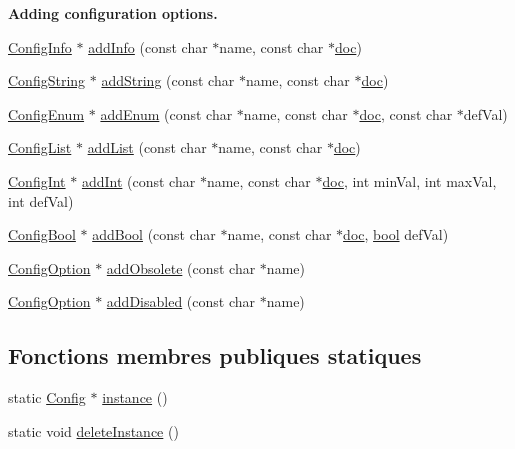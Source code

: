 \begin{Indent}{\bf Adding configuration options.}\par
\begin{DoxyCompactItemize}
\item 
\hyperlink{class_config_info}{Config\+Info} $\ast$ \hyperlink{class_config_ae00b233eba398ae52a97715150100cce}{add\+Info} (const char $\ast$name, const char $\ast$\hyperlink{vhdljjparser_8cpp_a9910424bf5401d657c3b3fdff6fcc152}{doc})
\item 
\hyperlink{class_config_string}{Config\+String} $\ast$ \hyperlink{class_config_a1651fce3b93ce21da4559c6bd3aa470b}{add\+String} (const char $\ast$name, const char $\ast$\hyperlink{vhdljjparser_8cpp_a9910424bf5401d657c3b3fdff6fcc152}{doc})
\item 
\hyperlink{class_config_enum}{Config\+Enum} $\ast$ \hyperlink{class_config_ab9fc76c9c08c212d1a4f05a9e532703b}{add\+Enum} (const char $\ast$name, const char $\ast$\hyperlink{vhdljjparser_8cpp_a9910424bf5401d657c3b3fdff6fcc152}{doc}, const char $\ast$def\+Val)
\item 
\hyperlink{class_config_list}{Config\+List} $\ast$ \hyperlink{class_config_a8d07cf5f9e8f427eda3949380c7c3207}{add\+List} (const char $\ast$name, const char $\ast$\hyperlink{vhdljjparser_8cpp_a9910424bf5401d657c3b3fdff6fcc152}{doc})
\item 
\hyperlink{class_config_int}{Config\+Int} $\ast$ \hyperlink{class_config_a1d264d5e39c9937449137267e8780cad}{add\+Int} (const char $\ast$name, const char $\ast$\hyperlink{vhdljjparser_8cpp_a9910424bf5401d657c3b3fdff6fcc152}{doc}, int min\+Val, int max\+Val, int def\+Val)
\item 
\hyperlink{class_config_bool}{Config\+Bool} $\ast$ \hyperlink{class_config_aa9fe790cffa0da8616a64a8e4c7d5836}{add\+Bool} (const char $\ast$name, const char $\ast$\hyperlink{vhdljjparser_8cpp_a9910424bf5401d657c3b3fdff6fcc152}{doc}, \hyperlink{qglobal_8h_a1062901a7428fdd9c7f180f5e01ea056}{bool} def\+Val)
\item 
\hyperlink{class_config_option}{Config\+Option} $\ast$ \hyperlink{class_config_a7ff40d5f1a20ac34ecc2d497dd6cd3da}{add\+Obsolete} (const char $\ast$name)
\item 
\hyperlink{class_config_option}{Config\+Option} $\ast$ \hyperlink{class_config_accfc0c75837e284e8e5c7d2770afcf4f}{add\+Disabled} (const char $\ast$name)
\end{DoxyCompactItemize}
\end{Indent}
\subsection*{Fonctions membres publiques statiques}
\begin{DoxyCompactItemize}
\item 
static \hyperlink{class_config}{Config} $\ast$ \hyperlink{class_config_ad62b66142ca8c837019cd04de34c8caa}{instance} ()
\item 
static void \hyperlink{class_config_a9ac848ef56b0923434a50bf658ed147a}{delete\+Instance} ()
\end{DoxyCompactItemize}

